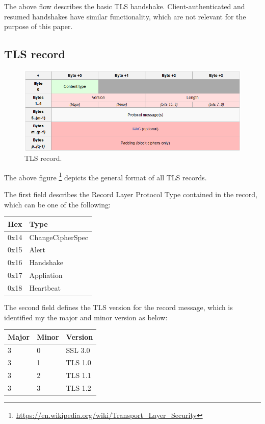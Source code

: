 The above flow describes the basic TLS handshake. Client-authenticated and
resumed handshakes have similar functionality, which are not relevant for the
purpose of this paper.

\subsection{TLS record}

\begin{figure}[H] \caption{TLS record.} \centering
\includegraphics[width=1\textwidth]{diagrams/tls_record.png}\end{figure}

The above figure
\footnote{\url{https://en.wikipedia.org/wiki/Transport_Layer_Security}} depicts
the general format of all TLS records.

The first field describes the Record Layer Protocol Type contained in the
record, which can be one of the following:

\begin{table}[H] \centering \begin{tabular}{ | l | l | } \hline \textbf{Hex} &
\textbf{Type} \\ \hline 0x14 & ChangeCipherSpec \\ 0x15 & Alert \\ 0x16 &
Handshake \\ 0x17 & Appliation \\ 0x18 & Heartbeat \\ \hline \end{tabular}
\end{table}

The second field defines the TLS version for the record message, which is
identified my the major and minor version as below:

\begin{table}[H] \centering \begin{tabular}{ | l | l | l | } \hline
\textbf{Major} & \textbf{Minor} & \textbf{Version} \\ \hline 3 & 0 & SSL 3.0 \\
3 & 1 & TLS 1.0 \\ 3 & 2 & TLS 1.1 \\ 3 & 3 & TLS 1.2 \\ \hline \end{tabular}
\end{table}

